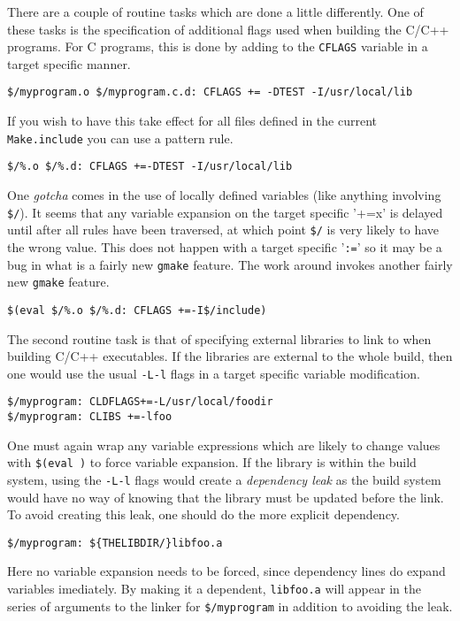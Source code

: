 \documentclass{article}
\begin{document}
There are a couple of routine tasks which are done a little
differently.  One of these tasks is the specification of additional
flags used when building the C/C++ programs.  For C programs, this is
done by adding to the \verb+CFLAGS+ variable in a target specific
manner.
\begin{verbatim}
$/myprogram.o $/myprogram.c.d: CFLAGS += -DTEST -I/usr/local/lib
\end{verbatim}
If you wish to have this take effect for all files defined in the
current \verb+Make.include+ you can use a pattern rule.
\begin{verbatim}
$/%.o $/%.d: CFLAGS +=-DTEST -I/usr/local/lib
\end{verbatim}
One {\em gotcha} comes in the use of locally defined variables
(like anything involving \verb+$/+).  It seems
that any variable expansion on the target specific '\verbx+=x' is
delayed until after all rules have been traversed, at which point
\verb+$/+ is very likely to have the wrong value.  This does not
happen with a target specific '\verb+:=+' so it may be a bug in what is
a fairly new \verb+gmake+ feature.  The work around invokes another
fairly new \verb+gmake+ feature.
\begin{verbatim}
$(eval $/%.o $/%.d: CFLAGS +=-I$/include)
\end{verbatim}
The second routine task is that of specifying external libraries to
link to when building C/C++ executables.  If the libraries are
external to the whole build, then one would use the usual \verb+-L-l+
flags in a target specific variable modification.
\begin{verbatim}
$/myprogram: CLDFLAGS+=-L/usr/local/foodir
$/myprogram: CLIBS +=-lfoo
\end{verbatim}
One must again wrap any variable expressions which are likely to change
values with \verb+$(eval )+ to force variable expansion.  If the
library is within the build system, using the \verb+-L-l+ flags would
create a {\em dependency leak} as the build system would have no
way of knowing that the library must be updated before the link.
To avoid creating this leak, one should do the more explicit dependency.
\begin{verbatim}
$/myprogram: ${THELIBDIR/}libfoo.a
\end{verbatim}
Here no variable expansion needs to be forced, since dependency lines
do expand variables imediately.  By making it a dependent, \verb+libfoo.a+
will appear in the series of arguments to the linker for \verb+$/myprogram+
in addition to avoiding the leak.
\end{document}
